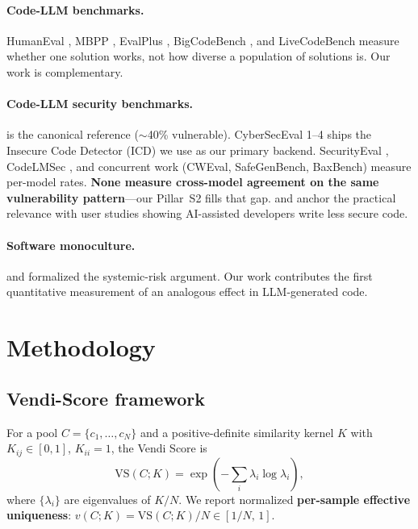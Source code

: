 \documentclass{article}
\begin{document}
\paragraph{Code-LLM benchmarks.}
HumanEval \citep{chen2021humaneval}, MBPP \citep{austin2021mbpp},
EvalPlus \citep{liu2023evalplus}, BigCodeBench \citep{zhuo2025bigcodebench},
and LiveCodeBench \citep{jain2024livecodebench} measure whether one solution
works, not how diverse a population of solutions is. Our work is
complementary.

\paragraph{Code-LLM security benchmarks.}
\citet{pearce2022asleep} is the canonical reference ($\sim$40\% vulnerable).
CyberSecEval 1--4 \citep{bhatt2023cyberseceval} ships the Insecure Code
Detector (ICD) we use as our primary backend. SecurityEval
\citep{siddiq2022securityeval}, CodeLMSec \citep{hajipour2024codelmsec},
and concurrent work (CWEval, SafeGenBench, BaxBench) measure per-model
rates. \textbf{None measure cross-model agreement on the same vulnerability
pattern}---our Pillar~S2 fills that gap. \citet{perry2023insecure} and
\citet{sandoval2023lostatc} anchor the practical relevance with user
studies showing AI-assisted developers write less secure code.

\paragraph{Software monoculture.}
\citet{geer2003} and \citet{birman2009} formalized the systemic-risk argument.
Our work contributes the first quantitative measurement of an analogous
effect in LLM-generated code.

\section{Methodology}
\label{sec:methodology}

\subsection{Vendi-Score framework}

For a pool $C=\{c_1,\dots,c_N\}$ and a positive-definite similarity kernel
$K$ with $K_{ij}\in[0,1]$, $K_{ii}=1$, the Vendi Score is
\begin{equation}
  \mathrm{VS}(C;K) = \exp\!\left(-\sum_i \lambda_i \log \lambda_i\right),
  \label{eq:vendi}
\end{equation}
where $\{\lambda_i\}$ are eigenvalues of $K/N$. We report normalized
\textbf{per-sample effective uniqueness}:
$v(C;K) = \mathrm{VS}(C;K)/N \in [1/N,\,1]$.
\end{document}
